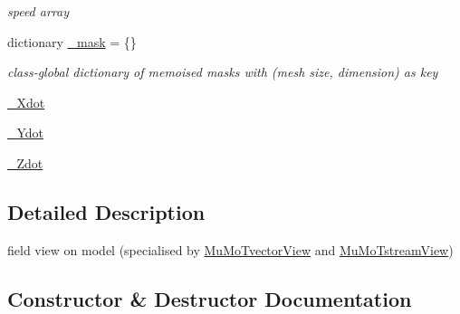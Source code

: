 \begin{DoxyCompactItemize}
\begin{DoxyCompactList}\small\item\em speed array \end{DoxyCompactList}\item 
dictionary \hyperlink{class_mu_mo_t_1_1_mu_mo_t_1_1_mu_mo_tfield_view_acbf4bc8fa26c3cf9e1d2741cc3dea058}{\+\_\+mask} = \{\}
\begin{DoxyCompactList}\small\item\em class-\/global dictionary of memoised masks with (mesh size, dimension) as key \end{DoxyCompactList}\item 
\hyperlink{class_mu_mo_t_1_1_mu_mo_t_1_1_mu_mo_tfield_view_a0f5fba57766067c941f5a96b22545ed4}{\+\_\+\+Xdot}
\item 
\hyperlink{class_mu_mo_t_1_1_mu_mo_t_1_1_mu_mo_tfield_view_a31f5ad9d4a349b00e06772177200c217}{\+\_\+\+Ydot}
\item 
\hyperlink{class_mu_mo_t_1_1_mu_mo_t_1_1_mu_mo_tfield_view_a4008c2e6651cb1bf1c9c1af3e962a25d}{\+\_\+\+Zdot}
\end{DoxyCompactItemize}


\subsection{Detailed Description}
field view on model (specialised by \hyperlink{class_mu_mo_t_1_1_mu_mo_t_1_1_mu_mo_tvector_view}{Mu\+Mo\+Tvector\+View} and \hyperlink{class_mu_mo_t_1_1_mu_mo_t_1_1_mu_mo_tstream_view}{Mu\+Mo\+Tstream\+View}) 

\subsection{Constructor \& Destructor Documentation}
\mbox{\label{class_mu_mo_t_1_1_mu_mo_t_1_1_mu_mo_tfield_view_a78d68546a28ea07c46f5f4a44ddfa49a}} 
